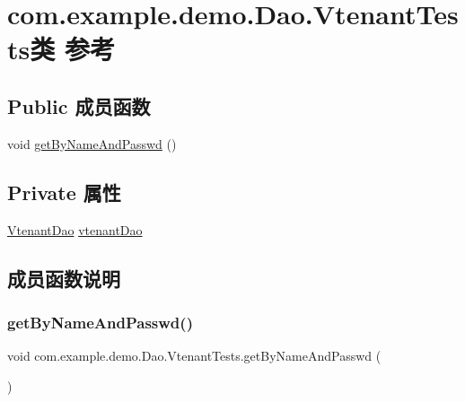 \hypertarget{classcom_1_1example_1_1demo_1_1_dao_1_1_vtenant_tests}{}\section{com.\+example.\+demo.\+Dao.\+Vtenant\+Tests类 参考}
\label{classcom_1_1example_1_1demo_1_1_dao_1_1_vtenant_tests}
\subsection*{Public 成员函数}
\begin{DoxyCompactItemize}
\item 
void \mbox{\hyperlink{classcom_1_1example_1_1demo_1_1_dao_1_1_vtenant_tests_a7008b098fcd9e81fbf2f75e6f0097dde}{get\+By\+Name\+And\+Passwd}} ()
\end{DoxyCompactItemize}
\subsection*{Private 属性}
\begin{DoxyCompactItemize}
\item 
\mbox{\hyperlink{interfacecom_1_1example_1_1demo_1_1dao_1_1_vtenant_dao}{Vtenant\+Dao}} \mbox{\hyperlink{classcom_1_1example_1_1demo_1_1_dao_1_1_vtenant_tests_ace4939e8892385b22e928448ea7ec5a5}{vtenant\+Dao}}
\end{DoxyCompactItemize}


\subsection{成员函数说明}
\mbox{\label{classcom_1_1example_1_1demo_1_1_dao_1_1_vtenant_tests_a7008b098fcd9e81fbf2f75e6f0097dde}} 
\subsubsection{\texorpdfstring{get\+By\+Name\+And\+Passwd()}{getByNameAndPasswd()}}
{\footnotesize\ttfamily void com.\+example.\+demo.\+Dao.\+Vtenant\+Tests.\+get\+By\+Name\+And\+Passwd (\begin{DoxyParamCaption}{ }\end{DoxyParamCaption})}




